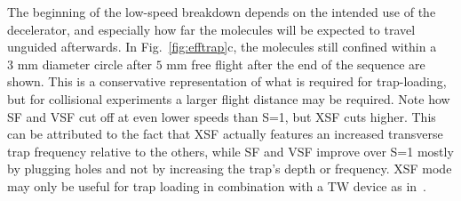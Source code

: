 \documentclass[%
 reprint,
 amsmath,amssymb,
 aps,
prl,
]{revtex4-1}
\begin{document}
The beginning of the low-speed breakdown depends on the intended use of the decelerator, and especially how far the molecules will be expected to travel unguided afterwards. 
In Fig.~\ref{fig:efftrap}c, the molecules still confined within a $3\text{ mm}$ diameter circle after $5\text{ mm}$ free flight after the end of the sequence are shown. 
This is a conservative representation of what is required for trap-loading, but for collisional experiments a larger flight distance may be required.
Note how SF and VSF cut off at even lower speeds than S=1, but XSF cuts higher. 
This can be attributed to the fact that XSF actually features an increased transverse trap frequency relative to the others, while SF and VSF improve over S=1 mostly by plugging holes and not by increasing the trap's depth or frequency.
XSF mode may only be useful for trap loading in combination with a TW device as in~\cite{Quintero-Perez2013}.

%
\end{document}
